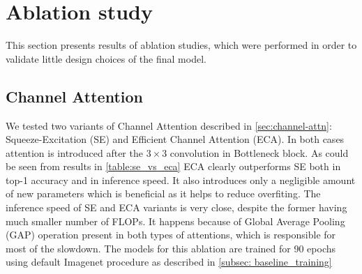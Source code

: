

\section{Ablation study} \label{sec:ablation}

This section presents results of ablation studies, which were performed in order to validate little design choices of the final model. 

\subsection{Channel Attention}
We tested two variants of Channel Attention described in \autoref{sec:channel-attn}: Squeeze-Excitation (SE) and Efficient Channel Attention (ECA). In both cases attention is introduced after the $3 \times 3$ convolution in Bottleneck block. As could be seen from results in \autoref{table:se_vs_eca} ECA clearly outperforms SE both in top-1 accuracy and in inference speed. It also introduces only a negligible amount of new parameters which is beneficial as it helps to reduce overfiting. The inference speed of SE and ECA variants is very close, despite the former having much smaller number of FLOPs. It happens because of Global Average Pooling (GAP) operation present in both types of attentions, which is responsible for most of the slowdown. The models for this ablation are trained for 90 epochs using default Imagenet procedure as described in \autoref{subsec: baseline_training}




